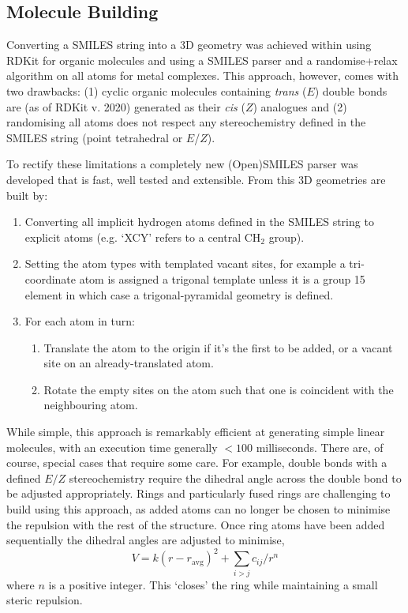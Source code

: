 \documentclass[../../main.tex]{subfiles}
\begin{document}
\subsection{Molecule Building}

Converting a SMILES string into a 3D geometry was achieved within \ade using RDKit\cite{Landrum2019} for organic molecules and using a SMILES parser and a randomise+relax algorithm on all atoms for metal complexes. This approach, however, comes with two drawbacks: (1) cyclic organic molecules containing \emph{trans} ($E$) double bonds are (as of RDKit v. 2020) generated as their \emph{cis} ($Z$) analogues and (2) randomising all atoms does not respect any stereochemistry defined in the SMILES string (point tetrahedral or $E$/$Z$).

To rectify these limitations a completely new (Open)SMILES parser was developed that is fast, well tested and extensible. From this 3D geometries are built by:

\begin{enumerate}
	\item Converting all implicit hydrogen atoms defined in the SMILES string to explicit atoms (e.g. `XCY' refers to a central CH$_2$ group).
	\item Setting the atom types with templated vacant sites, for example a tri-coordinate atom is assigned a trigonal template unless it is a group 15 element in which case a trigonal-pyramidal geometry is defined. 
	\item For each atom in turn:
	\begin{enumerate}
		\item Translate the atom to the origin if it's the first to be added, or a vacant site on an already-translated atom.
		\item Rotate the empty sites on the atom such that one is coincident with the neighbouring atom.
	\end{enumerate}
\end{enumerate}

While simple, this approach is remarkably efficient at generating simple linear molecules, with an execution time generally $<100$ milliseconds. There are, of course, special cases that require some care. For example, double bonds with a defined $E/Z$ stereochemistry require the dihedral angle across the double bond to be adjusted appropriately. Rings and particularly fused rings are challenging to build using this approach, as added atoms can no longer be chosen to minimise the repulsion with the rest of the structure. Once ring atoms have been added sequentially the dihedral angles are adjusted to minimise,
\begin{equation}
	V = k(r-r_\text{avg})^2 + \sum_{i>j} {c_{ij}}/{r^n}
\end{equation}
where $n$ is a positive integer. This `closes' the ring while maintaining a small steric repulsion. 
\end{document}
